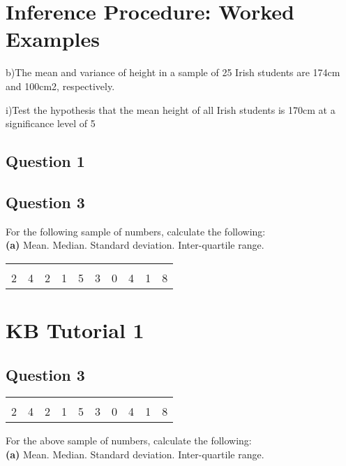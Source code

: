 \documentclass[]{article}
\begin{document}
	
\section{Inference Procedure: Worked Examples}



b)The mean and variance of height in a sample of 25 Irish students are 174cm and 100cm2, respectively.

i)Test the hypothesis that the mean height of all Irish students is 170cm at a significance level of 5%




	\subsection*{Question 1}
	
	\subsection*{Question 3}
	

	\noindent For the following sample of numbers, calculate the following:\\[0.2cm]
	{\bf(a)} Mean.  Median.  Standard deviation.  Inter-quartile range.
	
		\begin{center}
			\begin{tabular}{|cccccccccc|}
				\hline
				&&&&&&&&&\\[-0.4cm]
				2 & 4 & 2 & 1 & 5 & 3 & 0 & 4 & 1 & 8 \\
				\hline
			\end{tabular}
		\end{center}


\section{KB Tutorial 1}




\subsection*{Question 3}

\begin{center}
	\begin{tabular}{|cccccccccc|}
		\hline
		&&&&&&&&&\\[-0.4cm]
		2 & 4 & 2 & 1 & 5 & 3 & 0 & 4 & 1 & 8 \\
		\hline
	\end{tabular}
\end{center}

For the above sample of numbers, calculate the following:\\[0.2cm]
{\bf(a)} Mean.  Median.  Standard deviation.  Inter-quartile range.
\end{document}
